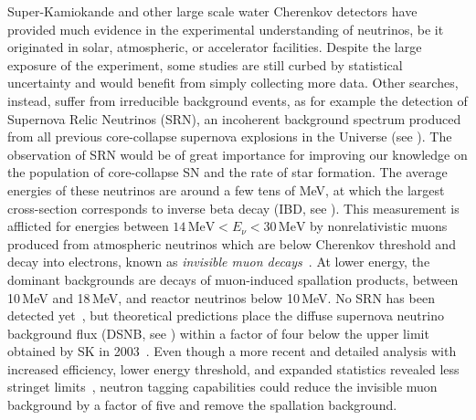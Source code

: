 Super-Kamiokande and other large scale water Cherenkov detectors have provided %
much evidence in the experimental understanding of neutrinos, %
be it originated in solar, atmospheric, or accelerator facilities.
Despite the large exposure of the experiment, some studies are still curbed by statistical uncertainty %
and would benefit from simply collecting more data.
Other searches, instead, suffer from irreducible background events, as for example the detection of Supernova Relic Neutrinos (SRN), %
an incoherent background spectrum produced from all previous core-collapse supernova explosions in the Universe (see ).
The observation of SRN would be of great importance for improving our knowledge on the population of core-collapse SN %
and the rate of star formation.
The average energies of these neutrinos are around a few tens of MeV, at which the largest cross-section %
corresponds to inverse beta decay (IBD, see ).
This measurement is afflicted for energies between $14\,\text{MeV} < E_\nu < 30\,\text{MeV}$ %
by nonrelativistic muons produced from atmospheric neutrinos which are below Cherenkov threshold and decay into electrons, %
known as \emph{invisible muon decays}~\cite{Kaplinghat:1999xi}.
At lower energy, the dominant backgrounds are decays of muon-induced spallation products, %
between 10\,MeV and 18\,MeV, and reactor neutrinos below 10\,MeV.
No SRN has been detected yet~\cite{Bays:2011si, Zhang:2013tua}, but %
theoretical predictions place the diffuse supernova neutrino background flux (DSNB, see ) %
within a factor of four below the upper limit obtained by SK in 2003~\cite{Malek:2002ns, Horiuchi:2008jz}.
Even though a more recent and detailed analysis with increased efficiency, lower energy threshold, and expanded statistics %
revealed less stringet limits~\cite{Bays:2011si}, neutron tagging capabilities could reduce %
the invisible muon background by a factor of five and remove the spallation background.



